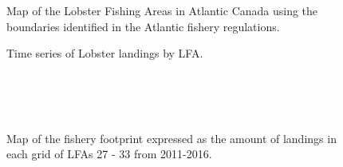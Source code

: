 \documentclass[11pt]{article}
\newcommand{\e}{/SpinDr/backup/bio_data/bio.lobster/figures/} %
\newcommand{\ebh}{/SpinDr/backup/bio_data/bio.lobster/figures/LFA2733Framework2018/} %
\begin{document}
\begin{landscape}
\begin{figure}
\centering
    \caption{Map of the Lobster Fishing Areas in Atlantic Canada using the boundaries identified in the Atlantic fishery regulations.}

\end{figure}
\end{landscape}

   \begin{figure}
    \centering
        \caption{Time series of Lobster landings by LFA.}

    \end{figure}


  \begin{figure}
        \centering
                \\
                \\
                \\
        
         \caption{Map of the fishery footprint expressed as the amount of landings in each grid of LFAs 27 - 33 from 2011-2016.}
        \end{figure}
\end{document}
